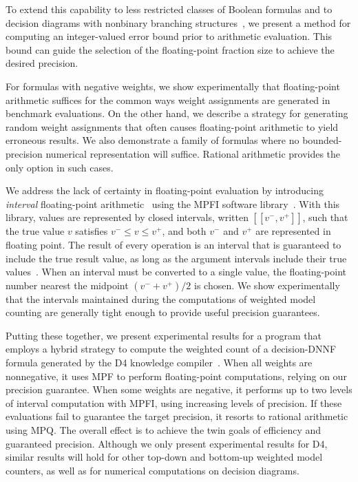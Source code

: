 \documentclass[letterpaper,USenglish,cleveref, autoref, thm-restate]{lipics-v2021}
\newcommand{\vmin}{v^{-}}
\newcommand{\vmax}{v^{+}}
\newcommand{\interval}[1]{[\![#1]\!]}
\begin{document}
To extend this capability to less restricted classes of Boolean
formulas and to decision diagrams with nonbinary branching
structures~\cite{darwiche:ijcai:2011,srinivasan:iccad:1990}, we
present a method for computing an integer-valued error bound prior to arithmetic
evaluation.  This bound can guide the selection of the floating-point fraction size to
achieve the desired precision.

For formulas with negative weights, 
we show experimentally that floating-point
arithmetic suffices for the common ways weight assignments are generated in benchmark evaluations.
On the other hand, we
describe a strategy for generating random weight assignments that
often causes floating-point arithmetic to yield erroneous results.
We also
demonstrate a family of
formulas where no bounded-precision numerical representation will
suffice.  Rational arithmetic provides the only option in such cases.


We address the lack of certainty in floating-point
evaluation by introducing \emph{interval} floating-point
arithmetic~\cite{hickey:jacm:2001} using the MPFI software
library~\cite{revol:rc:2005}. With this library, values are
represented by closed intervals, written $\interval{\vmin, \vmax}$, such that the
true value $v$ satisfies $\vmin \leq v \leq \vmax$, and both $\vmin$ and $\vmax$ are
represented in floating point.  The result of every operation is an
interval that is guaranteed to include the true result value, as long
as the argument intervals include their true values~\cite{hickey:jacm:2001,muller:hfpa:2018}.
When an interval must be converted to a single value, the floating-point number nearest the midpoint $(\vmin+\vmax)/2$ is chosen.
We show
experimentally that the intervals maintained during the computations
of weighted model counting are generally tight enough to provide
useful precision guarantees.

Putting these together, we present experimental results for a program
that employs a hybrid strategy to compute the weighted count of a decision-DNNF formula
generated by the D4 knowledge compiler~\cite{lagniez:ijcai:2017}.
When all weights are nonnegative, it uses MPF to
perform floating-point computations, relying on our precision
guarantee.  When some weights are negative, it performs up to two
levels of interval computation with MPFI, using increasing levels of
precision.  If these evaluations fail to guarantee the target precision,
it resorts to rational arithmetic using MPQ\@.  The overall effect
is to achieve the twin goals of efficiency and guaranteed precision.
Although we only present experimental results for D4, similar results will hold for other top-down and bottom-up weighted model counters, as well as
for numerical computations on decision diagrams.
\end{document}
